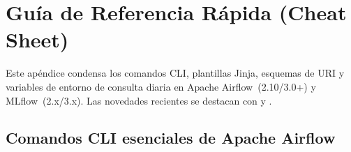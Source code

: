
\chapter[Guía de Referencia Rápida (Cheat Sheet)]{Guía de Referencia Rápida (Cheat Sheet)}\label{app:cheatsheet}

Este apéndice condensa los comandos CLI, plantillas Jinja, esquemas de URI y variables de entorno de consulta diaria en Apache Airflow~(2.10/3.0+) y MLflow~(2.x/3.x). Las novedades recientes se destacan con  y .

\section{Comandos CLI esenciales de Apache Airflow}\label{sec:cheat-airflow-cli}

